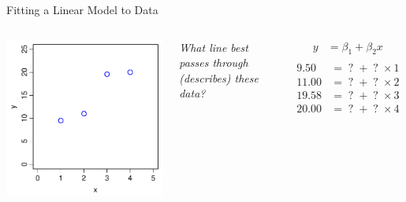 \documentclass[xcolor=x11names,compress]{beamer}
\renewcommand{\(}{\begin{columns}}
\renewcommand{\)}{\end{columns}}
\newcommand{\<}[1]{\begin{column}{#1}}
\renewcommand{\>}{\end{column}}
\begin{document}
    
\begin{frame}{Fitting a Linear Model to Data}

    \begin{columns}[T]
    
            \includegraphics[width=\textwidth]{Error.pdf}
            
            
        \begin{center}
            {\it What line best passes through (describes) these data?}
           \end{center}
           \pause
           \begin{align*}
              y  &= \beta_1 + \beta_2 x \\
            \end{align*}
            \pause
            \vspace{-40pt}
            \begin{align*}
               9.50  &= \;?\; + \;?\; \times 1 \\
              11.00 &= \;?\; + \;?\; \times 2 \\
              19.58 &= \;?\; + \;?\; \times 3 \\
              20.00 &= \;?\; + \;?\; \times 4   
            \end{align*}
             
    \end{columns}
    \end{frame}
    
\end{document}
